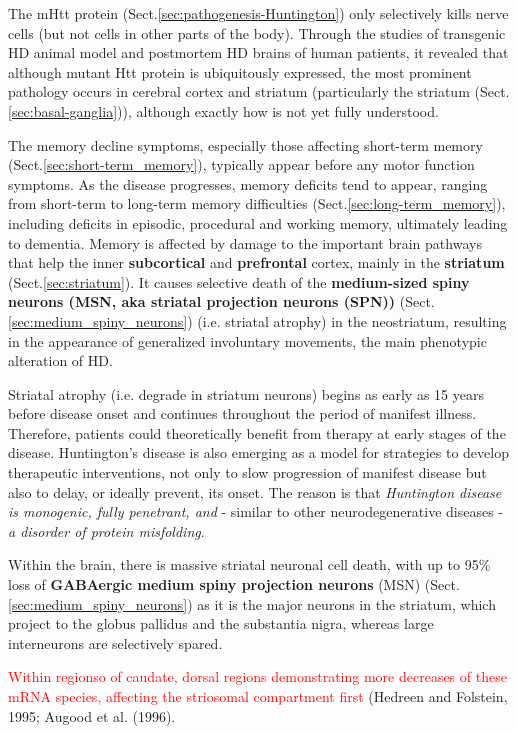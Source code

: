 The mHtt protein (Sect.\ref{sec:pathogenesis-Huntington}) only
selectively kills nerve cells (but not cells in other parts of the body).
Through the studies of transgenic HD animal model and postmortem HD brains of
human patients, it revealed that although mutant Htt protein is ubiquitously
expressed, the most prominent pathology occurs in cerebral cortex and striatum
(particularly the striatum (Sect.\ref{sec:basal-ganglia})), although
exactly how is not yet fully understood.



The memory decline symptoms, especially those affecting short-term memory
(Sect.\ref{sec:short-term_memory}), typically appear before any motor function
symptoms. As the disease progresses, memory deficits tend to appear, ranging
from short-term to long-term memory difficulties
(Sect.\ref{sec:long-term_memory}), including deficits in episodic, procedural
and working memory, ultimately leading to dementia.
Memory is affected by damage to the important brain pathways that help the inner
{\bf subcortical} and {\bf prefrontal} cortex, mainly in the {\bf striatum}
(Sect.\ref{sec:striatum}).
It causes selective death of the {\bf medium-sized spiny neurons (MSN, aka
striatal projection neurons (SPN))} (Sect.\ref{sec:medium_spiny_neurons})
(i.e. striatal atrophy) in the neostriatum, resulting in the appearance of
generalized involuntary movements, the main phenotypic alteration of HD.

Striatal atrophy (i.e. degrade in striatum neurons) begins as early as 15 years
before disease onset and continues throughout the period of manifest illness.
Therefore, patients could theoretically benefit from therapy at early stages of
the disease. Huntington's disease is also emerging as a model for strategies to
develop therapeutic interventions, not only to slow progression of manifest disease but
also to delay, or ideally prevent, its onset.
The reason is that {\it Huntington disease is monogenic, fully
penetrant, and} - similar to other neurodegenerative
diseases - {\it a disorder of protein misfolding}.

Within the brain, there is massive striatal neuronal cell death, with up to 95\%
loss of {\bf GABAergic medium spiny projection neurons} (MSN)
(Sect.\ref{sec:medium_spiny_neurons}) as it is the major neurons in the
striatum, which project to the globus pallidus and the substantia nigra, whereas
large interneurons are selectively spared.

\textcolor{red}{Within regionso of caudate, dorsal regions demonstrating more
decreases of these mRNA species, affecting the striosomal compartment first}
(Hedreen and Folstein, 1995; Augood et al. (1996).



